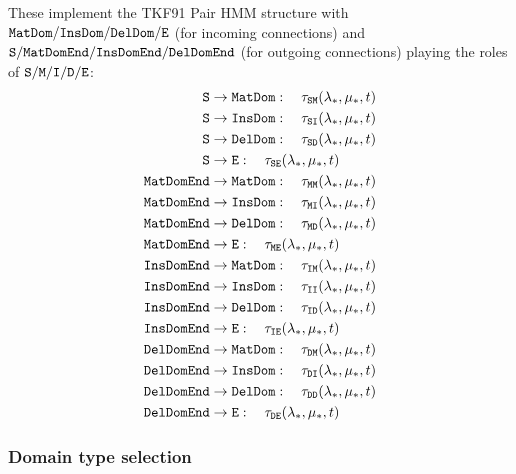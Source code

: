 \documentclass{article}
\begin{document}
These implement the TKF91 Pair HMM structure with $\mathtt{MatDom}/\mathtt{InsDom}/\mathtt{DelDom}/{\tt E}$ (for incoming connections) and ${\tt S}/\mathtt{MatDomEnd}/\mathtt{InsDomEnd}/\mathtt{DelDomEnd}$ (for outgoing connections)
playing the roles of ${\tt S}/{\tt M}/{\tt I}/{\tt D}/{\tt E}$:
\begin{align}
{\tt S} &\to \mathtt{MatDom}: \quad \tau_{{\tt S}{\tt M}}(\lambda_*,\mu_*,t) \\
{\tt S} &\to \mathtt{InsDom}: \quad \tau_{{\tt S}{\tt I}}(\lambda_*,\mu_*,t) \\
{\tt S} &\to \mathtt{DelDom}: \quad \tau_{{\tt S}{\tt D}}(\lambda_*,\mu_*,t) \\
{\tt S} &\to {\tt E}: \quad \tau_{{\tt S}{\tt E}}(\lambda_*,\mu_*,t) \\
\mathtt{MatDomEnd} &\to \mathtt{MatDom}: \quad \tau_{{\tt M}{\tt M}}(\lambda_*,\mu_*,t) \\
\mathtt{MatDomEnd} &\to \mathtt{InsDom}: \quad \tau_{{\tt M}{\tt I}}(\lambda_*,\mu_*,t) \\
\mathtt{MatDomEnd} &\to \mathtt{DelDom}: \quad \tau_{{\tt M}{\tt D}}(\lambda_*,\mu_*,t) \\
\mathtt{MatDomEnd} &\to {\tt E}: \quad \tau_{{\tt M}{\tt E}}(\lambda_*,\mu_*,t) \\
\mathtt{InsDomEnd} &\to \mathtt{MatDom}: \quad \tau_{{\tt I}{\tt M}}(\lambda_*,\mu_*,t) \\
\mathtt{InsDomEnd} &\to \mathtt{InsDom}: \quad \tau_{{\tt I}{\tt I}}(\lambda_*,\mu_*,t) \\
\mathtt{InsDomEnd} &\to \mathtt{DelDom}: \quad \tau_{{\tt I}{\tt D}}(\lambda_*,\mu_*,t) \\
\mathtt{InsDomEnd} &\to {\tt E}: \quad \tau_{{\tt I}{\tt E}}(\lambda_*,\mu_*,t) \\
\mathtt{DelDomEnd} &\to \mathtt{MatDom}: \quad \tau_{{\tt D}{\tt M}}(\lambda_*,\mu_*,t) \\
\mathtt{DelDomEnd} &\to \mathtt{InsDom}: \quad \tau_{{\tt D}{\tt I}}(\lambda_*,\mu_*,t) \\
\mathtt{DelDomEnd} &\to \mathtt{DelDom}: \quad \tau_{{\tt D}{\tt D}}(\lambda_*,\mu_*,t) \\
\mathtt{DelDomEnd} &\to {\tt E}: \quad \tau_{{\tt D}{\tt E}}(\lambda_*,\mu_*,t)
\end{align}

\subsubsection{Domain type selection}
\end{document}
